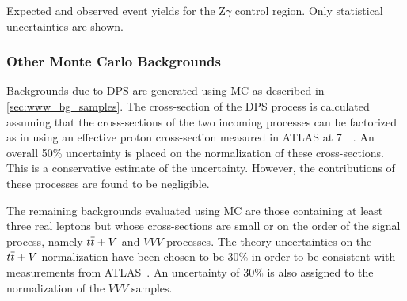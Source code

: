\begin{table}[ht!]
\centering

\caption{Expected and observed event yields for the Z$\gamma$ control region. 
Only statistical uncertainties are shown.}
\label{tab:Zgamma_CR}
\end{table}



\subsubsection{Other Monte Carlo Backgrounds}
\label{sec:otherbg}


Backgrounds due to DPS are generated using MC as described
in \sec\ref{sec:www_bg_samples}. The cross-section of the DPS process
is calculated assuming that the cross-sections of the two incoming processes
can be factorized as in \cite{Gaunt:2010pi} using an effective
proton cross-section measured in ATLAS at 7~\TeV~\cite{Aad:2013bjm}.
An overall 50\% uncertainty is placed on the normalization of these cross-sections.
This is a conservative estimate of the uncertainty.
However, the contributions of these processes are found to be negligible.


The remaining backgrounds evaluated using MC are those containing 
at least three real leptons but whose cross-sections are small or on 
the order of the signal process, namely $t\overline{t}+V$ and $VVV$ processes.
The theory uncertainties on the $t\overline{t}+V$ normalization have been 
chosen to be 30\% in order to be consistent with measurements from
ATLAS~\cite{ATLAS-CONF-2015-032}. 
An uncertainty of 30\% is also assigned to the normalization of the 
$VVV$ samples.
